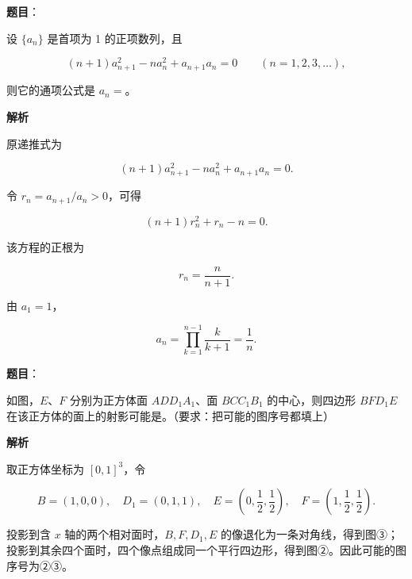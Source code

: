 \begin{answer}

\textbf{题目}：

设 $\{a_n\}$ 是首项为 1 的正项数列，且

\nopagebreak[4]
\[
(n+1)a_{n+1}^2-na_n^2+a_{n+1}a_n=0
\qquad(n=1,2,3,\ldots),
\]

则它的通项公式是 $a_n=$\gkblank{}。

\textbf{解析}

原递推式为

\nopagebreak[4]
\[
(n+1)a_{n+1}^2-na_n^2+a_{n+1}a_n=0.
\]

令 $r_n=a_{n+1}/a_n>0$，可得

\nopagebreak[4]
\[
(n+1)r_n^2+r_n-n=0.
\]

该方程的正根为

\nopagebreak[4]
\[
r_n=\frac{n}{n+1}.
\]

由 $a_1=1$，

\nopagebreak[4]
\[
a_n=\prod_{k=1}^{n-1}\frac{k}{k+1}=\frac1n.
\]


\end{answer}
\begin{answer}

\textbf{题目}：

如图，$E$、$F$ 分别为正方体面 $ADD_1A_1$、面 $BCC_1B_1$ 的中心，则四边形 $BFD_1E$ 在该正方体的面上的射影可能是\gkblank{}。（要求：把可能的图序号都填上）
\nopagebreak[4]
\begin{center}\end{center}
\nopagebreak[4]
\textbf{解析}

取正方体坐标为 $[0,1]^3$，令

\nopagebreak[4]
\[
B=(1,0,0),\quad D_1=(0,1,1),\quad
E=\left(0,\frac12,\frac12\right),\quad
F=\left(1,\frac12,\frac12\right).
\]

投影到含 $x$ 轴的两个相对面时，$B,F,D_1,E$ 的像退化为一条对角线，得到图③；投影到其余四个面时，四个像点组成同一个平行四边形，得到图②。因此可能的图序号为②③。


\end{answer}


